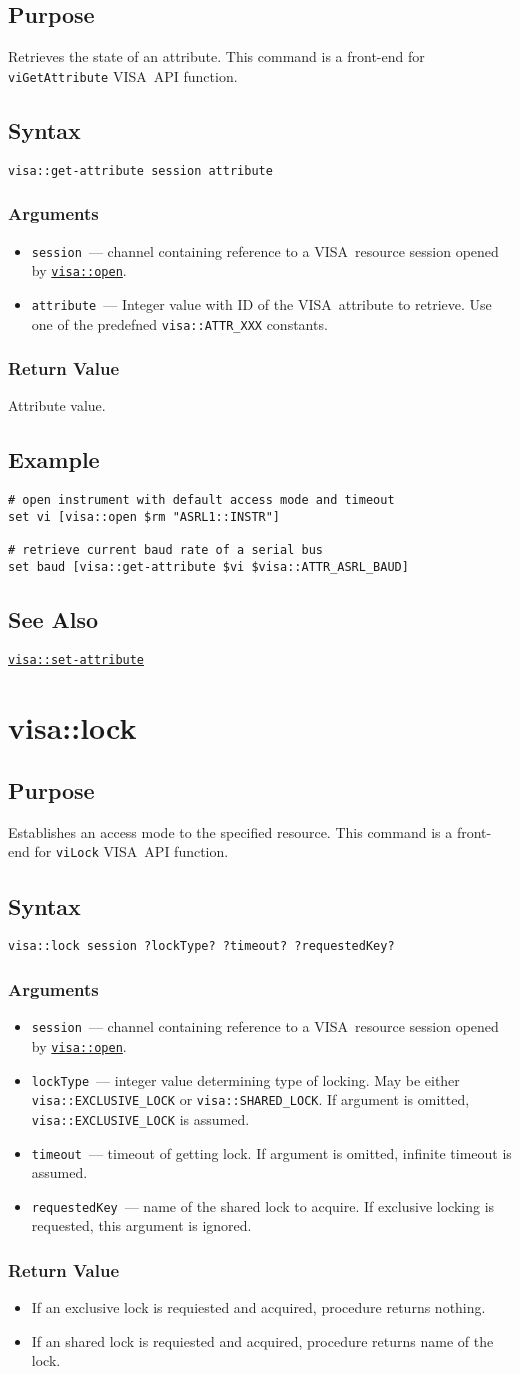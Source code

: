 \documentclass[12pt, a4paper]{report}
\newcommand{\VISA}{\mbox{VISA }}
\newcommand{\COMMANDREF}[1]{{\tt \hyperref[#1]{#1}}}
\newcommand{\VISACOMMANDREF}[1]{{\tt \mbox{#1}}\index{#1}}
\newcommand{\SEEALSO}{\subsection*{See Also}}
\newcommand{\EXAMPLE}{\subsection*{Example}}
\newcommand{\PURPOSE}{\subsection*{Purpose}}
\newcommand{\SYNTAX}[1]{\subsection*{Syntax}{\tt #1}}
\newcommand{\ARGUMENTS}{\subsubsection*{Arguments}}
\newcommand{\RETURN}{\subsubsection*{Return Value}}
\newcommand{\COMMAND}[1]{\section{#1}\label{#1}}
\newcommand{\BEGINARGUMENTS}{\ARGUMENTS\begin{itemize}}
\newcommand{\ENDARGUMENTS}{\end{itemize}}
\newcommand{\ARGUMENT}[1]{\item {\tt \mbox{#1}}~---}
\newcommand{\ARGCHANNEL}{\ARGUMENT{session} channel containing reference to a \VISA resource session opened by \COMMANDREF{visa::open}.}
\begin{document}
\PURPOSE

Retrieves the state of an attribute. This command is a front-end for \VISACOMMANDREF{viGetAttribute} \VISA API function.

\SYNTAX{visa::get-attribute session attribute}

\BEGINARGUMENTS
\ARGCHANNEL
\ARGUMENT{attribute} Integer value with ID of the \VISA attribute to retrieve. Use one of the predefned {\tt visa::ATTR\_XXX} constants.
\ENDARGUMENTS

\RETURN

Attribute value.

\EXAMPLE

\begin{verbatim} 
# open instrument with default access mode and timeout
set vi [visa::open $rm "ASRL1::INSTR"]

# retrieve current baud rate of a serial bus
set baud [visa::get-attribute $vi $visa::ATTR_ASRL_BAUD]
\end{verbatim} 

\SEEALSO

\COMMANDREF{visa::set-attribute}


\COMMAND{visa::lock}

\PURPOSE

Establishes an access mode to the specified resource. This command is a front-end for \VISACOMMANDREF{viLock} \VISA API function.

\SYNTAX{visa::lock session ?lockType? ?timeout? ?requestedKey?}

\BEGINARGUMENTS
\ARGCHANNEL
\ARGUMENT{lockType} integer value determining type of locking. May be either {\tt visa::EXCLUSIVE\_LOCK} or {\tt visa::SHARED\_LOCK}. If argument is omitted, {\tt visa::EXCLUSIVE\_LOCK} is assumed.
\ARGUMENT{timeout} timeout of getting lock. If argument is omitted, infinite timeout is assumed.
\ARGUMENT{requestedKey} name of the shared lock to acquire. If exclusive locking is requested, this argument is ignored.
\ENDARGUMENTS

\RETURN

\begin{itemize}
\item If an exclusive lock is requiested and acquired, procedure returns nothing.
\item If an shared lock is requiested and acquired, procedure returns name of the lock.
\end{itemize}
\end{document}
